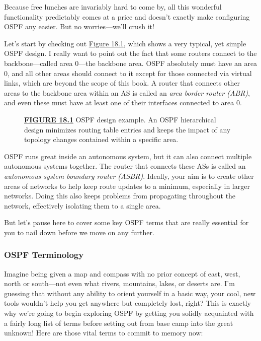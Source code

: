 Because free lunches are invariably hard to come by, all this wonderful
functionality predictably comes at a price and doesn't exactly make
configuring OSPF any easier. But no worries---we'll crush it!

Let's start by checking out
\protect\hyperlink{c18.xhtmlux5cux23figure18-1}{Figure 18.1}, which
shows a very typical, yet simple OSPF design. I really want to point out
the fact that some routers connect to the backbone---called area 0---the
backbone area. OSPF absolutely must have an area 0, and all other areas
should connect to it except for those connected via virtual links, which
are beyond the scope of this book. A router that connects other areas to
the backbone area within an AS is called an \emph{area border router
(ABR)}, and even these must have at least one of their interfaces
connected to area 0.

\begin{figure}
\centering
\caption{{\protect\hyperlink{c18.xhtmlux5cux23figureanchor18-1}{\textbf{FIGURE
18.1}} OSPF design example. An OSPF hierarchical design minimizes
routing table entries and keeps the impact of any topology changes
contained within a specific area.}}
\end{figure}

OSPF runs great inside an autonomous system, but it can also connect
multiple autonomous systems together. The router that connects these ASs
is called an \emph{autonomous system boundary router (ASBR)}. Ideally,
your aim is to create other areas of networks to help keep route updates
to a minimum, especially in larger networks. Doing this also keeps
problems from propagating throughout the network, effectively isolating
them to a single area.

But let's pause here to cover some key OSPF terms that are really
essential for you to nail down before we move on any further.

\subsubsection[OSPF
Terminology]{\texorpdfstring{\protect\hypertarget{c18.xhtmlux5cux23c18-sec-2}{}{}\protect\hypertarget{c18.xhtmlux5cux23Page_749}{}{}OSPF
Terminology}{OSPF Terminology}}

Imagine being given a map and compass with no prior concept of east,
west, north or south---not even what rivers, mountains, lakes, or
deserts are. I'm guessing that without any ability to orient yourself in
a basic way, your cool, new tools wouldn't help you get anywhere but
completely lost, right? This is exactly why we're going to begin
exploring OSPF by getting you solidly acquainted with a fairly long list
of terms before setting out from base camp into the great unknown! Here
are those vital terms to commit to memory now:


